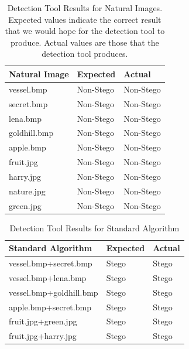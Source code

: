 \documentclass{l4proj}
\begin{document}
\begin{appendices}
\begin{table}[!h]
\centering
\caption{Detection Tool Results for Natural Images. Expected values indicate the correct result that we would hope for the detection tool to produce. Actual values are those that the detection tool produces.}
\label{table:detection_results_natural_images}
\begin{tabular}{@{}lll@{}}
\toprule
Natural Image & Expected  & Actual    \\ \midrule
vessel.bmp    & Non-Stego & Non-Stego \\
secret.bmp    & Non-Stego & Non-Stego \\
lena.bmp      & Non-Stego & Non-Stego \\
goldhill.bmp  & Non-Stego &Non-Stego \\
apple.bmp     & Non-Stego & Non-Stego \\
fruit.jpg     & Non-Stego & Non-Stego \\
harry.jpg     & Non-Stego & Non-Stego \\
nature.jpg    & Non-Stego & Non-Stego \\
green.jpg     & Non-Stego & Non-Stego \\ \bottomrule
\end{tabular}
\end{table}

\begin{table}[!h]
\centering
\caption{Detection Tool Results for Standard Algorithm}
\label{table:detection_results_standard_algorithm}
\begin{tabular}{@{}lll@{}}
\toprule
Standard Algorithm      & Expected & Actual    \\ \midrule
vessel.bmp+secret.bmp   & Stego    & Stego     \\
vessel.bmp+lena.bmp     & Stego    & Stego     \\
vessel.bmp+goldhill.bmp & Stego    & Stego     \\
apple.bmp+secret.bmp    & Stego    & Stego     \\
fruit.jpg+green.jpg     & Stego    & Stego \\
fruit.jpg+harry.jpg     & Stego    & Stego     \\ \bottomrule
\end{tabular}
\end{table}


\end{appendices}
\end{document}
